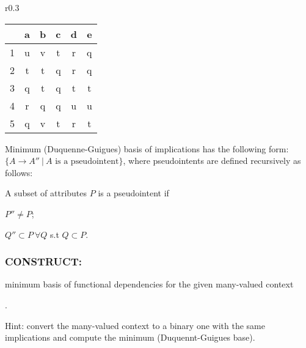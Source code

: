 \documentclass[12pt]{report}
\begin{document}
\begin{problem}{}
    {\begin{wrapfigure}{r}{0.3\columnwidth} 
        \begin{flushright}
        \begin{tabular}{c|c|c|c|c|c|}
            & a & b & c & d & e \\ \hline
          1 & u & v & t & r & q \\ \hline
          2 & t & t & q & r & q \\ \hline
          3 & q & t & q & t & t \\ \hline
          4 & r & q & q & u & u \\ \hline
          5 & q & v & t & r & t \\ \hline
          \end{tabular}
        \end{flushright}
   \end{wrapfigure}
    Minimum (Duquenne-Guigues) basis of implications has the following form: $\{A \to A''\ |\ A \text{ is a pseudointent}\}$, where pseudointents are defined recursively as follows:
    
    \begin{definition}{}{}
        A subset of attributes $P$ is a pseudointent if 
        \begin{enumerate*}
            \item $P'' \neq P$;
            \item $Q'' \subset P \ \forall Q$ s.t $Q \subset P.$
        \end{enumerate*}
    \end{definition}
    \subsubsection*{CONSTRUCT:} minimum basis of functional dependencies for the given many-valued context}.
    \vspace*{0.5cm}

    {\color{green} Hint}: convert the many-valued context to a binary one with the same implications and compute the minimum (Duquennt-Guigues base).
\end{problem}
\end{document}
